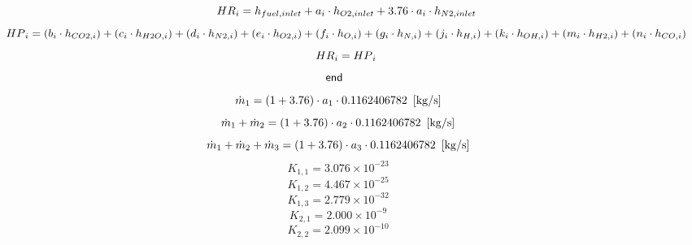 \documentclass[10pt,fleqn]{article}
\newcommand{\K}[1]{\mbox{\sf#1\ \ \mit}}
\newcommand{\V}[1]{\mbox{$ #1 $}}
\newcommand{\I}{\mbox{\hspace{0.20in}}}
\begin{document}
\begin{equation}
\I \label{EES Eqn:53}
\V{HR} _{i} =  h_{fuel,inlet} + a_{i} \cdot  h_{O2,inlet} + 3.76 \cdot  a_{i} \cdot  h_{N2,inlet} 
\end{equation}
\begin{equation}
\I \label{EES Eqn:54}
\V{HP} _{i} =  \left( b_{i} \cdot  h_{CO2,i} \right)  +  \left( c_{i} \cdot  h_{H2O,i} \right)  +  \left( d_{i} \cdot  h_{N2,i} \right)  +  \left( e_{i} \cdot  h_{O2,i} \right)  +  \left( f_{i} \cdot  h_{O,i} \right)  +  \left( g_{i} \cdot  h_{N,i} \right)  +  \left( j_{i} \cdot  h_{H,i} \right)  +  \left( k_{i} \cdot  h_{OH,i} \right)  +  \left( m_{i} \cdot  h_{H2,i} \right)  +  \left( n_{i} \cdot  h_{CO,i} \right)  
\end{equation}
\begin{equation}
\I \label{EES Eqn:55}
\V{HR} _{i} = \V{HP} _{i} 
\end{equation}
\begin{equation}
\label{EES Eqn:56}
\K{end} 
\end{equation}
\begin{equation}
\label{EES Eqn:57}
\dot {m}_{1} =  \left( 1 + 3.76 \right)  \cdot  a_{1} \cdot  0.1162406782   \   \left[ \rm kg/s \right] 
\end{equation}
\rm
\begin{equation}
\label{EES Eqn:58}
\dot {m}_{1} + \dot {m}_{2} =  \left( 1 + 3.76 \right)  \cdot  a_{2} \cdot  0.1162406782   \   \left[ \rm kg/s \right] 
\end{equation}
\rm
\begin{equation}
\label{EES Eqn:59}
\dot {m}_{1} + \dot {m}_{2} + \dot {m}_{3} =  \left( 1 + 3.76 \right)  \cdot  a_{3} \cdot  0.1162406782   \   \left[ \rm kg/s \right] 
\end{equation}
\rm
\begin{equation}
\label{EES Eqn:60}
K_{1,1} = 3.076\times 10^{-23} 
\end{equation}
\begin{equation}
\label{EES Eqn:61}
K_{1,2} = 4.467\times 10^{-25} 
\end{equation}
\begin{equation}
\label{EES Eqn:62}
K_{1,3} = 2.779\times 10^{-32} 
\end{equation}
\begin{equation}
\label{EES Eqn:63}
K_{2,1} = 2.000\times 10^{-9} 
\end{equation}
\begin{equation}
\label{EES Eqn:64}
K_{2,2} = 2.099\times 10^{-10} 
\end{equation}
\end{document}
